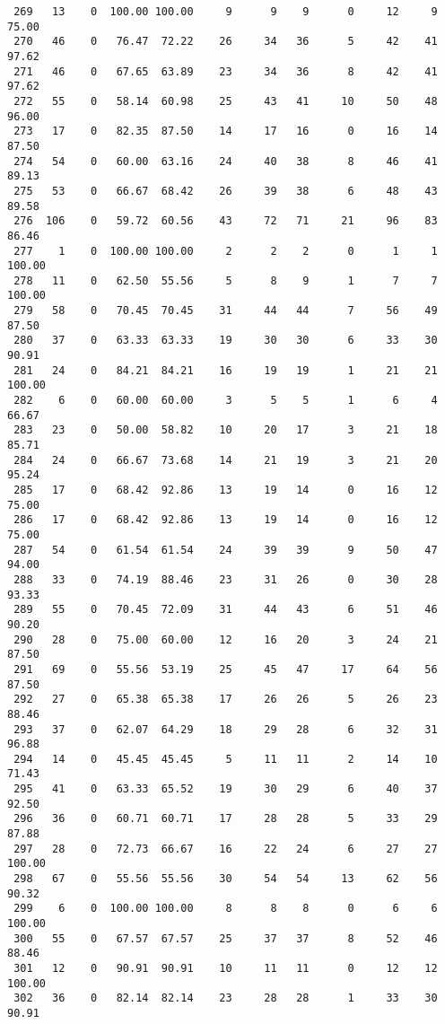 \begin{verbatim}
 269   13    0  100.00 100.00     9      9    9      0     12     9    75.00
 270   46    0   76.47  72.22    26     34   36      5     42    41    97.62
 271   46    0   67.65  63.89    23     34   36      8     42    41    97.62
 272   55    0   58.14  60.98    25     43   41     10     50    48    96.00
 273   17    0   82.35  87.50    14     17   16      0     16    14    87.50
 274   54    0   60.00  63.16    24     40   38      8     46    41    89.13
 275   53    0   66.67  68.42    26     39   38      6     48    43    89.58
 276  106    0   59.72  60.56    43     72   71     21     96    83    86.46
 277    1    0  100.00 100.00     2      2    2      0      1     1   100.00
 278   11    0   62.50  55.56     5      8    9      1      7     7   100.00
 279   58    0   70.45  70.45    31     44   44      7     56    49    87.50
 280   37    0   63.33  63.33    19     30   30      6     33    30    90.91
 281   24    0   84.21  84.21    16     19   19      1     21    21   100.00
 282    6    0   60.00  60.00     3      5    5      1      6     4    66.67
 283   23    0   50.00  58.82    10     20   17      3     21    18    85.71
 284   24    0   66.67  73.68    14     21   19      3     21    20    95.24
 285   17    0   68.42  92.86    13     19   14      0     16    12    75.00
 286   17    0   68.42  92.86    13     19   14      0     16    12    75.00
 287   54    0   61.54  61.54    24     39   39      9     50    47    94.00
 288   33    0   74.19  88.46    23     31   26      0     30    28    93.33
 289   55    0   70.45  72.09    31     44   43      6     51    46    90.20
 290   28    0   75.00  60.00    12     16   20      3     24    21    87.50
 291   69    0   55.56  53.19    25     45   47     17     64    56    87.50
 292   27    0   65.38  65.38    17     26   26      5     26    23    88.46
 293   37    0   62.07  64.29    18     29   28      6     32    31    96.88
 294   14    0   45.45  45.45     5     11   11      2     14    10    71.43
 295   41    0   63.33  65.52    19     30   29      6     40    37    92.50
 296   36    0   60.71  60.71    17     28   28      5     33    29    87.88
 297   28    0   72.73  66.67    16     22   24      6     27    27   100.00
 298   67    0   55.56  55.56    30     54   54     13     62    56    90.32
 299    6    0  100.00 100.00     8      8    8      0      6     6   100.00
 300   55    0   67.57  67.57    25     37   37      8     52    46    88.46
 301   12    0   90.91  90.91    10     11   11      0     12    12   100.00
 302   36    0   82.14  82.14    23     28   28      1     33    30    90.91

\end{verbatim}
